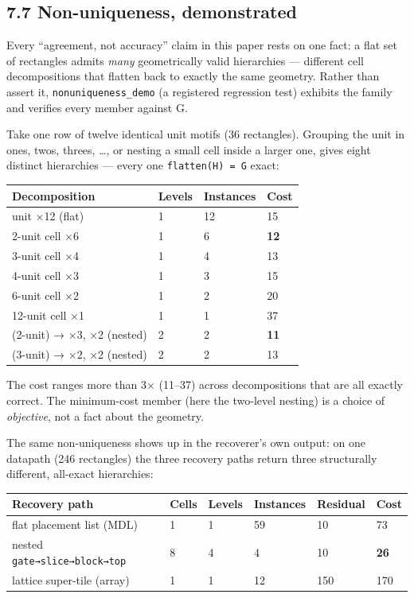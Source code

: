\documentclass[
  11pt,
]{article}
\newcounter{none} %
\begin{document}
\subsection{7.7 Non-uniqueness,
demonstrated}\label{non-uniqueness-demonstrated}

Every ``agreement, not accuracy'' claim in this paper rests on one fact:
a flat set of rectangles admits \emph{many} geometrically valid
hierarchies --- different cell decompositions that flatten back to
exactly the same geometry. Rather than assert it,
\texttt{nonuniqueness\_demo} (a registered regression test) exhibits the
family and verifies every member against G.

Take one row of twelve identical unit motifs (36 rectangles). Grouping
the unit in ones, twos, threes, \ldots, or nesting a small cell inside a
larger one, gives eight distinct hierarchies --- every one
\texttt{flatten(H)\ =\ G} exact:

{\def\LTcaptype{none} %
\begin{longtable}[]{@{}llll@{}}
\toprule\noalign{}
Decomposition & Levels & Instances & Cost \\
\midrule\noalign{}
\endhead
\bottomrule\noalign{}
\endlastfoot
unit ×12 (flat) & 1 & 12 & 15 \\
2-unit cell ×6 & 1 & 6 & \textbf{12} \\
3-unit cell ×4 & 1 & 4 & 13 \\
4-unit cell ×3 & 1 & 3 & 15 \\
6-unit cell ×2 & 1 & 2 & 20 \\
12-unit cell ×1 & 1 & 1 & 37 \\
(2-unit) → ×3, ×2 (nested) & 2 & 2 & \textbf{11} \\
(3-unit) → ×2, ×2 (nested) & 2 & 2 & 13 \\
\end{longtable}
}

The cost ranges more than 3× (11--37) across decompositions that are all
exactly correct. The minimum-cost member (here the two-level nesting) is
a choice of \emph{objective}, not a fact about the geometry.

The same non-uniqueness shows up in the recoverer's own output: on one
datapath (246 rectangles) the three recovery paths return three
structurally different, all-exact hierarchies:

{\def\LTcaptype{none} %
\begin{longtable}[]{@{}llllll@{}}
\toprule\noalign{}
Recovery path & Cells & Levels & Instances & Residual & Cost \\
\midrule\noalign{}
\endhead
\bottomrule\noalign{}
\endlastfoot
flat placement list (MDL) & 1 & 1 & 59 & 10 & 73 \\
nested \texttt{gate→slice→block→top} & 8 & 4 & 4 & 10 & \textbf{26} \\
lattice super-tile (array) & 1 & 1 & 12 & 150 & 170 \\
\end{longtable}
}
\end{document}
